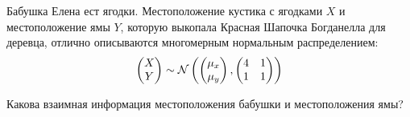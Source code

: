 Бабушка Елена ест ягодки. Местоположение кустика с ягодками $X$ и местоположение ямы $Y$, которую выкопала Красная Шапочка Богданелла для деревца, отлично описываются многомерным нормальным распределением:
\[\begin{pmatrix} 
    X \\ 
    Y 
  \end{pmatrix}\sim \mathcal{N}\left(\begin{pmatrix} 
      \mu _x \\ 
      \mu _y 
    \end{pmatrix},
    \begin{pmatrix} 
      4 & 1 \\ 
      1 & 1
    \end{pmatrix}\right)\]

Какова взаимная информация местоположения бабушки и местоположения ямы?

